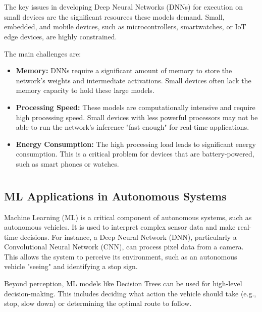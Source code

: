 \documentclass[a4paper,12pt]{article}
\begin{document}
\section{}

The key issues in developing Deep Neural Networks (DNNs) for execution on small devices are the significant resources these models demand. Small, embedded, and mobile devices, such as microcontrollers, smartwatches, or IoT edge devices, are highly constrained.

The main challenges are:
\begin{itemize}
    \item \textbf{Memory:} DNNs require a significant amount of memory to store the network's weights and intermediate activations. Small devices often lack the memory capacity to hold these large models.
    \item \textbf{Processing Speed:} These models are computationally intensive and require high processing speed. Small devices with less powerful processors may not be able to run the network's inference "fast enough" for real-time applications.
    \item \textbf{Energy Consumption:} The high processing load leads to significant energy consumption. This is a critical problem for devices that are battery-powered, such as smart phones or watches.
\end{itemize}

\section{}
\subsection{ML Applications in Autonomous Systems}
Machine Learning (ML) is a critical component of autonomous systems, such as autonomous vehicles. It is used to interpret complex sensor data and make real-time decisions. For instance, a Deep Neural Network (DNN), particularly a Convolutional Neural Network (CNN), can process pixel data from a camera. This allows the system to perceive its environment, such as an autonomous vehicle "seeing" and identifying a stop sign.

Beyond perception, ML models like Decision Trees can be used for high-level decision-making. This includes deciding what action the vehicle should take (e.g., stop, slow down) or determining the optimal route to follow.
\end{document}
